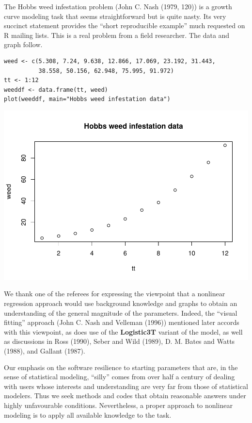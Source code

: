 The Hobbs weed infestation problem (John C. Nash (1979, 120)) is a growth curve modeling
task that seems straightforward but is quite nasty. Its very succinct statement
provides the ``short reproducible example'' much requested on R mailing lists.
This is a real problem from a field researcher. The data and graph follow.

\begin{verbatim}
weed <- c(5.308, 7.24, 9.638, 12.866, 17.069, 23.192, 31.443,
          38.558, 50.156, 62.948, 75.995, 91.972)
tt <- 1:12
weeddf <- data.frame(tt, weed)
plot(weeddf, main="Hobbs weed infestation data")
\end{verbatim}

\includegraphics{ComparingNLStools_files/figure-latex/ex01-1.pdf}

We thank one of the referees for expressing the viewpoint that a nonlinear regression
approach would use background knowledge and graphs to obtain an understanding of
the general magnitude of the parameters. Indeed, the ``visual fitting'' approach
(John C. Nash and Velleman (1996)) mentioned later accords with this viewpoint, as does use
of the \textbf{Logistic3T} variant of the model, as well as discussions in Ross (1990),
Seber and Wild (1989), D. M. Bates and Watts (1988), and Gallant (1987).

Our emphasis on the software resilience to starting parameters that are, in the
sense of statistical modeling, ``silly'' comes from over half a century of dealing
with users whose interests and understanding are very far from those of statistical
modelers. Thus we seek methods and codes that obtain reasonable answers under
highly unfavourable conditions. Nevertheless, a proper approach to
nonlinear modeling is to apply all available knowledge to the task.


